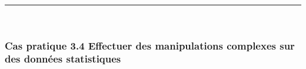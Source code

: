 \documentclass[12pt,twosided, notitlepage]{book}
\begin{document}
\begin{center}\rule{0.5\linewidth}{\linethickness}\end{center}

~

\subsubsection{\texorpdfstring{\textbf{Cas pratique 3.4} Effectuer des
manipulations complexes sur des données
statistiques}{Cas pratique 3.4 Effectuer des manipulations complexes sur des données statistiques}}\label{cas-pratique-3.4-effectuer-des-manipulations-complexes-sur-des-donnees-statistiques}

\end{document}
